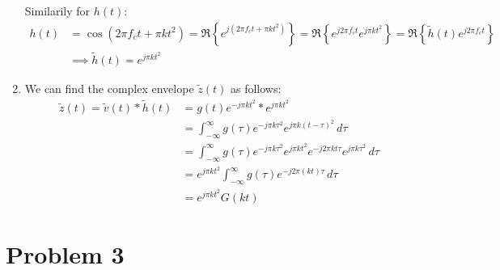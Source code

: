 \documentclass{article}
\begin{document}
\begin{enumerate}[label=2.\arabic*]
    Similarily for $h(t)$:
    \begin{align*}
        h(t) &= \cos(2\pi f_c t + \pi k t^2) = \mathfrak{R}\left\{e^{j(2\pi f_c t + \pi k t^2)}\right\} = \mathfrak{R}\left\{e^{j2\pi f_c t}e^{j\pi kt^2}\right\} = \mathfrak{R}\left\{\tilde{h}(t)e^{j2\pi f_c t}\right\} \\
        &\implies \tilde{h}(t) = e^{j\pi k t^2}
    \end{align*}

    \item We can find the complex envelope $\tilde{z}(t)$ as follows:
    \begin{align*}
        \tilde{z}(t) = \tilde{v}(t) \ast \tilde{h}(t) &= g(t)e^{-j\pi k t^2} \ast e^{j\pi k t^2} \\
        &= \int_{-\infty}^{\infty} g(\tau)e^{-j\pi k \tau^2}e^{j\pi k (t-\tau)^2} \, d\tau \\
        &= \int_{-\infty}^{\infty} g(\tau)e^{-j\pi k \tau^2}e^{j\pi k t^2}e^{-j2\pi k t\tau}e^{j\pi k \tau^2} \, d\tau \\
        &= e^{j\pi k t^2} \int_{-\infty}^{\infty} g(\tau)e^{-j2\pi (k t)\tau} \, d\tau \\
        &= e^{j\pi k t^2} G(kt)
    \end{align*}

\end{enumerate}


\section{Problem 3}
\end{document}
